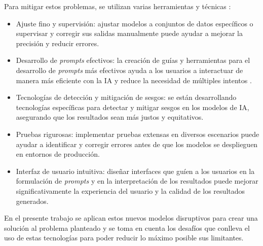 Para mitigar estos problemas, se utilizan varias herramientas y técnicas  \citep{TowardsAI2024}:

\begin{itemize}
    \item Ajuste fino y supervisión: ajustar modelos a conjuntos de datos específicos o supervisar y corregir sus salidas manualmente puede ayudar a mejorar la precisión y reducir errores.
    \item Desarrollo de \textit{prompts} efectivos: la creación de guías y herramientas para el desarrollo de \textit{prompts} más efectivos ayuda a los usuarios a interactuar de manera más eficiente con la IA y reduce la necesidad de múltiples intentos \citep{HatchWorks2024} \citep{arXiv2024Prompt}.
    \item Tecnologías de detección y mitigación de sesgos: se están desarrollando tecnologías específicas para detectar y mitigar sesgos en los modelos de IA, asegurando que los resultados sean más justos y equitativos.
    \item Pruebas rigurosas: implementar pruebas extensas en diversos escenarios puede ayudar a identificar y corregir errores antes de que los modelos se desplieguen en entornos de producción.
    \item Interfaz de usuario intuitiva: diseñar interfaces que guíen a los usuarios en la formulación de \textit{prompts} y en la interpretación de los resultados puede mejorar significativamente la experiencia del usuario y la calidad de los resultados generados.
\end{itemize}

En el presente trabajo se aplican estos nuevos modelos disruptivos para crear una solución al problema planteado y se toma en cuenta los desafíos que conlleva el uso de estas tecnologías para poder reducir lo máximo posible sus limitantes.
